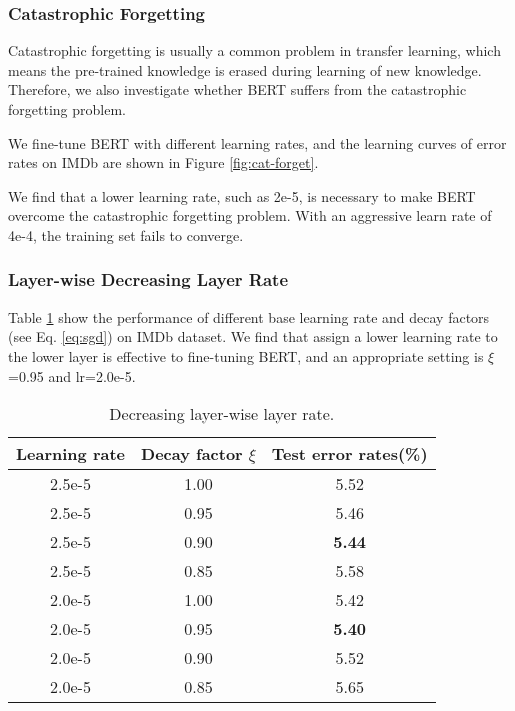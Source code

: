\documentclass[11pt,a4paper]{article}
\theoremstyle{definition}
\begin{document}
\begin{CJK*}{UTF8}{gbsn}
\subsubsection{Catastrophic Forgetting}
Catastrophic forgetting \cite{mccloskey1989catastrophic} is usually a common problem in transfer learning, which means the pre-trained knowledge is erased during learning of new knowledge. Therefore, we also investigate whether BERT suffers from the catastrophic forgetting problem.

We fine-tune BERT with different learning rates, and the learning curves of error rates on IMDb are shown in Figure \ref{fig:cat-forget}.

We find that a lower learning rate, such as 2e-5, is necessary to make BERT overcome the catastrophic forgetting problem. With an aggressive learn rate of 4e-4, the training set fails to converge.


\subsubsection{Layer-wise Decreasing Layer Rate}
Table \ref{tb:layer-wise-lr} show the performance of different base learning rate and decay factors (see Eq. \eqref{eq:sgd}) on IMDb dataset. We find that assign a lower learning rate to the lower layer is effective to fine-tuning BERT, and an appropriate setting is $\xi$=0.95 and lr=2.0e-5.

\begin{table}[h!]\small
\centering
\begin{tabular}{c c c}
	\toprule
	Learning rate & Decay factor $\xi$ & Test error rates(\%) \\
	\midrule
	2.5e-5 & 1.00 & 5.52 \\
	2.5e-5 & 0.95 & 5.46 \\
    2.5e-5 & 0.90 & \textbf{5.44} \\
    2.5e-5 & 0.85 & 5.58 \\
    \midrule
    2.0e-5 & 1.00 & 5.42 \\
    2.0e-5 & 0.95 & \textbf{5.40} \\
    2.0e-5 & 0.90 & 5.52 \\
    2.0e-5 & 0.85 & 5.65 \\
	\bottomrule
\end{tabular}
\caption{Decreasing layer-wise layer rate.
}\label{tb:layer-wise-lr}
\end{table}







\end{CJK*}
\end{document}
